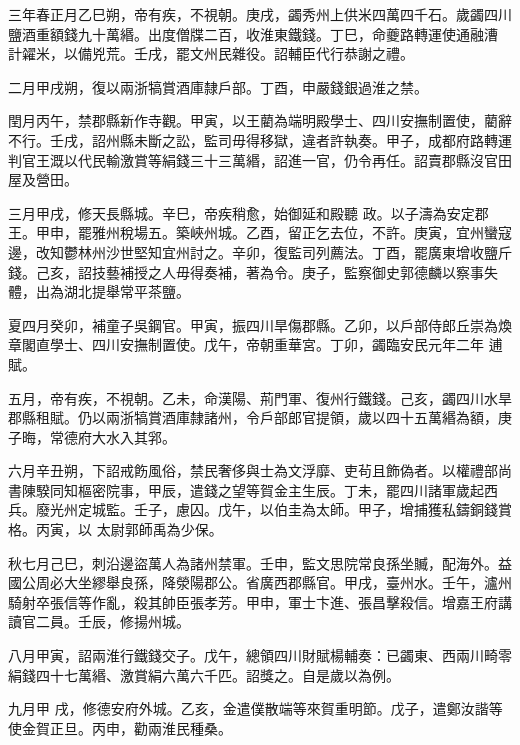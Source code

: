 \begin{pinyinscope}
 三年春正月乙巳朔，帝有疾，不視朝。庚戌，蠲秀州上供米四萬四千石。歲蠲四川鹽酒重額錢九十萬緡。出度僧牒二百，收淮東鐵錢。丁巳，命夔路轉運使通融漕
 計糴米，以備兇荒。壬戌，罷文州民雜役。詔輔臣代行恭謝之禮。



 二月甲戌朔，復以兩浙犒賞酒庫隸戶部。丁酉，申嚴錢銀過淮之禁。



 閏月丙午，禁郡縣新作寺觀。甲寅，以王藺為端明殿學士、四川安撫制置使，藺辭不行。壬戌，詔州縣未斷之訟，監司毋得移獄，違者許執奏。甲子，成都府路轉運判官王溉以代民輸激賞等絹錢三十三萬緡，詔進一官，仍令再任。詔賣郡縣沒官田屋及營田。



 三月甲戌，修天長縣城。辛巳，帝疾稍愈，始御延和殿聽
 政。以子濤為安定郡王。甲申，罷雅州稅場五。築峽州城。乙酉，留正乞去位，不許。庚寅，宜州蠻寇邊，改知鬱林州沙世堅知宜州討之。辛卯，復監司列薦法。丁酉，罷廣東增收鹽斤錢。己亥，詔技藝補授之人毋得奏補，著為令。庚子，監察御史郭德麟以察事失體，出為湖北提舉常平茶鹽。



 夏四月癸卯，補童子吳鋼官。甲寅，振四川旱傷郡縣。乙卯，以戶部侍郎丘崇為煥章閣直學士、四川安撫制置使。戊午，帝朝重華宮。丁卯，蠲臨安民元年二年
 逋賦。



 五月，帝有疾，不視朝。乙未，命漢陽、荊門軍、復州行鐵錢。己亥，蠲四川水旱郡縣租賦。仍以兩浙犒賞酒庫隸諸州，令戶部郎官提領，歲以四十五萬緡為額，庚子晦，常德府大水入其郛。



 六月辛丑朔，下詔戒飭風俗，禁民奢侈與士為文浮靡、吏茍且飾偽者。以權禮部尚書陳騤同知樞密院事，甲辰，遣錢之望等賀金主生辰。丁未，罷四川諸軍歲起西兵。廢光州定城監。壬子，慮囚。戊午，以伯圭為太師。甲子，增捕獲私鑄銅錢賞格。丙寅，以
 太尉郭師禹為少保。



 秋七月己巳，刺沿邊盜萬人為諸州禁軍。壬申，監文思院常良孫坐贓，配海外。益國公周必大坐繆舉良孫，降滎陽郡公。省廣西郡縣官。甲戌，臺州水。壬午，瀘州騎射卒張信等作亂，殺其帥臣張孝芳。甲申，軍士卞進、張昌擊殺信。增嘉王府講讀官二員。壬辰，修揚州城。



 八月甲寅，詔兩淮行鐵錢交子。戊午，總領四川財賦楊輔奏：已蠲東、西兩川畸零絹錢四十七萬緡、激賞絹六萬六千匹。詔獎之。自是歲以為例。



 九月甲
 戌，修德安府外城。乙亥，金遣僕散端等來賀重明節。戊子，遣鄭汝諧等使金賀正旦。丙申，勸兩淮民種桑。




\end{pinyinscope}
